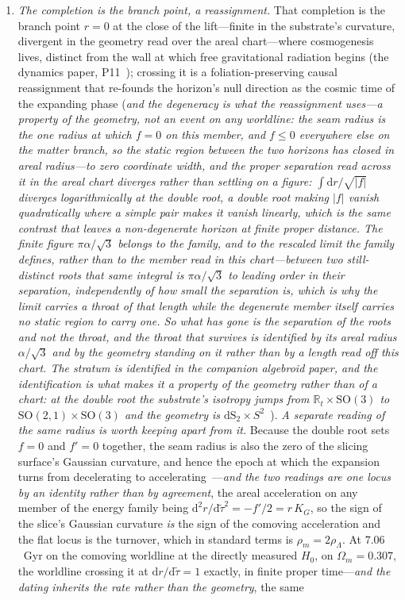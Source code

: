 \documentclass[11pt,a4paper]{article}
\theoremstyle{plain}
\theoremstyle{definition}
\theoremstyle{remark}
\newcommand{\dS}{\mathrm{dS}}
\begin{document}
\begin{enumerate}
\item \emph{The completion is the branch point, a reassignment.} That completion is the branch point $r=0$ at the close of the lift---finite in the substrate's curvature, divergent in the geometry read over the areal chart---where
cosmogenesis lives, distinct from the wall at which free gravitational radiation begins (the
dynamics paper, P11~\cite{JanzenDynamics}); crossing it is a foliation-preserving
causal reassignment that re-founds the horizon's null direction as the cosmic time of the
expanding phase (\emph{and the degeneracy is what the reassignment uses---a property of the geometry, not an event on any worldline: the seam radius is the one radius at which $f=0$ on this member, and $f\le0$ everywhere else on the matter branch, so the static region between the two horizons has closed in areal radius---to zero coordinate width, and the proper separation read across it in the areal chart diverges rather than settling on a figure: $\int\!\mathrm{d}r/\sqrt{|f|}$ diverges logarithmically at the double root, a double root making $|f|$ vanish quadratically where a simple pair makes it vanish linearly, which is the same contrast that leaves a non-degenerate horizon at finite proper distance. \emph{The finite figure $\pi\alpha/\sqrt{3}$ belongs to the family, and to the rescaled limit the family defines, rather than to the member read in this chart}---between two still-distinct roots that same integral is $\pi\alpha/\sqrt{3}$ to leading order in their separation, independently of how small the separation is, which is why the limit carries a throat of that length while the degenerate member itself carries no static region to carry one. \emph{So what has gone is the separation of the roots and not the throat, and the throat that survives is identified by its areal radius $\alpha/\sqrt{3}$ and by the geometry standing on it rather than by a length read off this chart.} \emph{The stratum is identified in the companion algebroid paper, and the identification is what makes it a property of the geometry rather than of a chart}: at the double root the substrate's isotropy jumps from $\mathbb{R}_{t}\times\mathrm{SO}(3)$ to $\mathrm{SO}(2,1)\times\mathrm{SO}(3)$ and the geometry is $\dS_2\times S^2$~\cite{JanzenAlgebroid}}). \emph{A separate reading of the same radius is worth keeping apart from it.} Because the double root sets $f=0$ and $f'=0$ together, the seam radius is also the zero of the slicing surface's Gaussian curvature, and hence the epoch at which the expansion turns from decelerating to accelerating~\cite{JanzenSlicing}---\emph{and the two readings are one locus by an identity rather than by agreement}, the areal acceleration on any member of the energy family being $\mathrm{d}^{2}r/\mathrm{d}\tilde\tau^{2}=-f'/2=r\,K_{G}$, so the sign of the slice's Gaussian curvature \emph{is} the sign of the comoving acceleration and the flat locus is the turnover, which in standard terms is $\rho_{m}=2\rho_{\Lambda}$. At $7.06$~Gyr on the comoving worldline at the directly measured $H_{0}$, on $\Omega_{m}=0.307$, the worldline crossing it at $\mathrm{d}r/\mathrm{d}\tilde\tau=1$ exactly, in finite proper time---\emph{and the dating inherits the rate rather than the geometry}, the same 
\end{enumerate}
\end{document}
